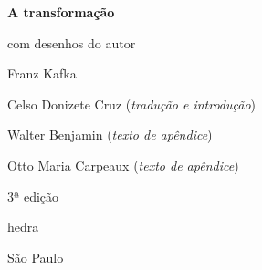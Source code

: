 




\begingroup\thispagestyle{empty}\vspace*{.05\textheight} 

              \formular
              \Huge
              \noindent
              \textbf{A transformação}
              \vspace{-0.35em}

              {\braboitalic\Large
              \noindent{}com desenhos do autor}
              \medskip  
              
              {\brabo\LARGE
              \noindent Franz Kafka}
              

              \vfill
              
              \newfontfamily{}
              {\fontsize{30}{40}\selectfont\minion\small
              \noindent{}Celso Donizete Cruz (\textit{tradução e introdução})\\
              
              \vspace{-1em}
              
              \noindent{}Walter Benjamin (\textit{texto de apêndice})\\

              \vspace{-2.7em}
              
              \noindent{}Otto Maria Carpeaux (\textit{texto de apêndice})
              }

              \noindent
              {\fontsize{30}{40}\selectfont\minion\small\noindent 3ª edição}

              \vfill

              \newfontfamily{}
              {\noindent\fontsize{30}{40}\selectfont \timesnewroman hedra}

              \vspace{-0.5cm}
              {\selectfont\minion\small\noindent São Paulo \quad\the\year}

\endgroup
\pagebreak
